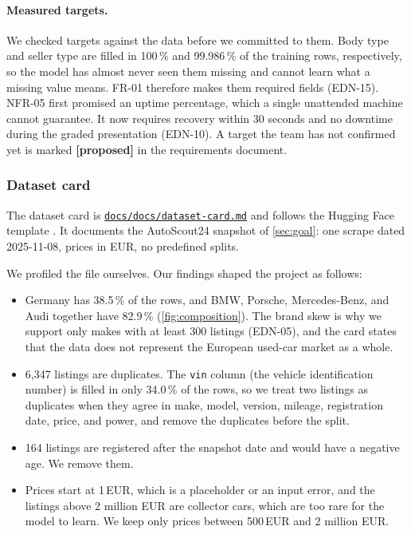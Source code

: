 \paragraph{Measured targets.}
We checked targets against the data before we committed to them.
Body type and seller type are filled in 100\,\% and 99.986\,\% of the training rows, respectively, so the model has almost never seen them missing and cannot learn what a missing value means.
FR-01 therefore makes them required fields (EDN-15).
NFR-05 first promised an uptime percentage, which a single unattended machine cannot guarantee. It now requires recovery within 30 seconds and no downtime during the graded presentation (EDN-10).
A target the team has not confirmed yet is marked \textbf{[proposed]} in the requirements document.

\subsubsection{Dataset card}
\label{sec:m1-dataset-card}

The dataset card is \href{https://github.com/mlops-2627q1-mds-upc/MLOPS_Recommenditos/blob/main/docs/docs/dataset-card.md}{\texttt{docs/docs/dataset-card.md}} and follows the Hugging Face template \cite{hf-dataset-card}.
It documents the AutoScout24 snapshot of \cref{sec:goal}: one scrape dated 2025-11-08, prices in EUR, no predefined splits.

We profiled the file ourselves. Our findings shaped the project as follows:

\begin{itemize}
  \item Germany has 38.5\,\% of the rows, and BMW, Porsche, Mercedes-Benz, and Audi together have 82.9\,\% (\cref{fig:composition}). The brand skew is why we support only makes with at least 300 listings (EDN-05), and the card states that the data does not represent the European used-car market as a whole.
  \item 6,347 listings are duplicates. The \texttt{vin} column (the vehicle identification number) is filled in only 34.0\,\% of the rows, so we treat two listings as duplicates when they agree in make, model, version, mileage, registration date, price, and power, and remove the duplicates before the split.
  \item 164 listings are registered after the snapshot date and would have a negative age. We remove them.
  \item Prices start at 1\,EUR, which is a placeholder or an input error, and the listings above 2 million EUR are collector cars, which are too rare for the model to learn. We keep only prices between 500\,EUR and 2 million EUR.
\end{itemize}

